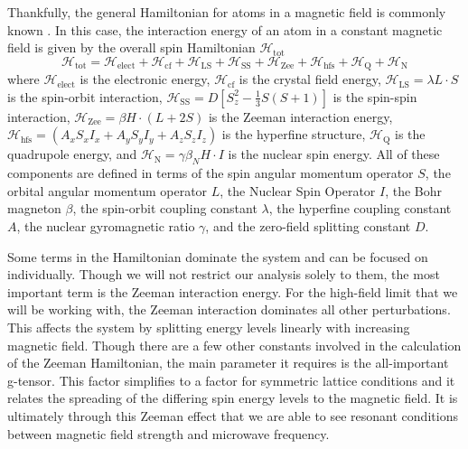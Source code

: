 \documentclass[oneside, noacknowlegments]{BYUPhys}
\begin{document}
Thankfully, the general Hamiltonian for atoms in a magnetic field is commonly known \cite{RefWorks:doc:58929c15e4b0228a29292c58} \cite{RefWorks:doc:589295bde4b0d4c09201f692}. In this case, the interaction energy of an atom in a constant magnetic field is given by the overall spin Hamiltonian $\mathcal{H}_{\text{tot}}$ \cite{RefWorks:doc:589293f5e4b0dec22aee39de} $$\mathcal{H}_{\text{tot}} = \mathcal{H}_{\text{elect}} + \mathcal{H}_{\text{cf}} + \mathcal{H}_{\text{LS}} + \mathcal{H}_{\text{SS}} + \mathcal{H}_{\text{Zee}} + \mathcal{H}_{\text{hfs}} + \mathcal{H}_{\text{Q}} + \mathcal{H}_{\text{N}}$$ where $\mathcal{H}_{\text{elect}}$ is the electronic energy, $\mathcal{H}_{\text{cf}}$ is the crystal field energy, $\mathcal{H}_{\text{LS}} = \lambda L \cdot S$ is the spin-orbit interaction, $\mathcal{H}_{\text{SS}} = D \left[ S_{z}^{2} - \frac{1}{3} S (S+1) \right]$ is the spin-spin interaction, $\mathcal{H}_{\text{Zee}} = \beta H \cdot (L+2S)$ is the Zeeman interaction energy, $\mathcal{H}_{\text{hfs}} = \left(A_xS_xI_x + A_yS_yI_y + A_zS_zI_z\right)$ is the hyperfine structure, $\mathcal{H}_{\text{Q}}$ is the quadrupole energy, and $\mathcal{H}_{\text{N}} = \gamma \beta_{N} H \cdot I$ is the nuclear spin energy. All of these components are defined in terms of the spin angular momentum operator $S$, the orbital angular momentum operator $L$, the Nuclear Spin Operator $I$, the Bohr magneton $\beta$, the spin-orbit coupling constant $\lambda$, the hyperfine coupling constant $A$, the nuclear gyromagnetic ratio $\gamma$, and the zero-field splitting constant $D$.

Some terms in the Hamiltonian dominate the system and can be focused on individually. Though we will not restrict our analysis solely to them, the most important term is the Zeeman interaction energy. For the high-field limit that we will be working with, the Zeeman interaction dominates all other perturbations. This affects the system by splitting energy levels linearly with increasing magnetic field. Though there are a few other constants involved in the calculation of the Zeeman Hamiltonian, the main parameter it requires is the all-important g-tensor. This factor simplifies to a factor for symmetric lattice conditions and it relates the spreading of the differing spin energy levels to the magnetic field. It is ultimately through this Zeeman effect that we are able to see resonant conditions between magnetic field strength and microwave frequency.
\end{document}
